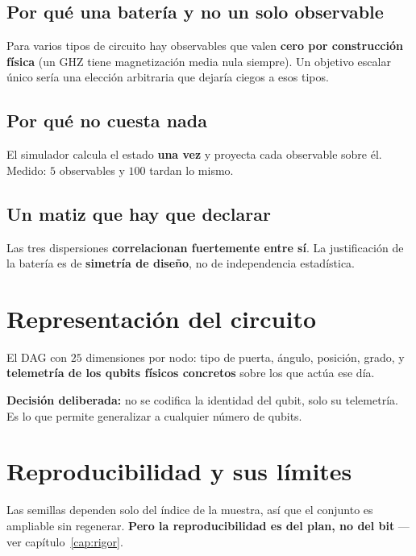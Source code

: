 \subsection{Por qué una batería y no un solo observable}
Para varios tipos de circuito hay observables que valen \textbf{cero por construcción física}
(un GHZ tiene magnetización media nula siempre). Un objetivo escalar único sería una elección
arbitraria que dejaría ciegos a esos tipos.

\subsection{Por qué no cuesta nada}
El simulador calcula el estado \textbf{una vez} y proyecta cada observable sobre él. Medido:
$5$ observables y $100$ tardan lo mismo.

\subsection{Un matiz que hay que declarar}
Las tres dispersiones \textbf{correlacionan fuertemente entre sí}. La justificación de la
batería es de \textbf{simetría de diseño}, no de independencia estadística.

\section{Representación del circuito}
\label{sec:representacion}
El DAG con $25$ dimensiones por nodo: tipo de puerta, ángulo, posición, grado, y
\textbf{telemetría de los qubits físicos concretos} sobre los que actúa ese día.

\textbf{Decisión deliberada:} no se codifica la identidad del qubit, solo su telemetría. Es lo
que permite generalizar a cualquier número de qubits.
\section{Reproducibilidad y sus límites}
\label{sec:reproducibilidad}
Las semillas dependen solo del índice de la muestra, así que el conjunto es ampliable sin
regenerar. \textbf{Pero la reproducibilidad es del plan, no del bit} —ver
capítulo~\ref{cap:rigor}.
